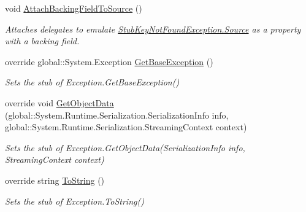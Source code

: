 \begin{DoxyCompactItemize}
void \hyperlink{class_system_1_1_collections_1_1_generic_1_1_fakes_1_1_stub_key_not_found_exception_a1d6b150188ac2cf75fc1e995abe3315d}{Attach\-Backing\-Field\-To\-Source} ()
\begin{DoxyCompactList}\small\item\em Attaches delegates to emulate \hyperlink{class_system_1_1_collections_1_1_generic_1_1_fakes_1_1_stub_key_not_found_exception_a4ba298dfb161adf6d2b309d495323e20}{Stub\-Key\-Not\-Found\-Exception.\-Source} as a property with a backing field.\end{DoxyCompactList}\item 
override global\-::\-System.\-Exception \hyperlink{class_system_1_1_collections_1_1_generic_1_1_fakes_1_1_stub_key_not_found_exception_aacb85cdc1991d92ebf22176d3eb0b6a5}{Get\-Base\-Exception} ()
\begin{DoxyCompactList}\small\item\em Sets the stub of Exception.\-Get\-Base\-Exception()\end{DoxyCompactList}\item 
override void \hyperlink{class_system_1_1_collections_1_1_generic_1_1_fakes_1_1_stub_key_not_found_exception_a79b70314dc7cc88f29462fb0782d800c}{Get\-Object\-Data} (global\-::\-System.\-Runtime.\-Serialization.\-Serialization\-Info info, global\-::\-System.\-Runtime.\-Serialization.\-Streaming\-Context context)
\begin{DoxyCompactList}\small\item\em Sets the stub of Exception.\-Get\-Object\-Data(\-Serialization\-Info info, Streaming\-Context context)\end{DoxyCompactList}\item 
override string \hyperlink{class_system_1_1_collections_1_1_generic_1_1_fakes_1_1_stub_key_not_found_exception_a8ba3e8b1de2a264d60d9475d62b2a397}{To\-String} ()
\begin{DoxyCompactList}\small\item\em Sets the stub of Exception.\-To\-String()\end{DoxyCompactList}\end{DoxyCompactItemize}
